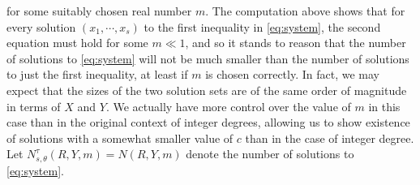 \documentclass[11pt,reqno]{amsart}
\numberwithin{equation}{section}
\begin{document}
for some suitably chosen real number $m$. The computation above shows that for every solution $(x_1,\cdots, x_s)$ to the first inequality in \eqref{eq:system}, the second equation must hold for some $m \ll 1$, and so it stands to reason that the number of solutions to \eqref{eq:system} will not be much smaller than the number of solutions to just the first inequality, at least if $m$ is chosen correctly. In fact, we may expect that the sizes of the two solution sets are of the same order of magnitude in terms of $X$ and $Y$. We actually have more control over the value of $m$ in this case than in the original context of integer degrees, allowing us to show existence of solutions with a somewhat smaller value of $c$ than in the case of integer degree. Let $N_{s,\theta}^{\tau}(R,Y,m) = N(R,Y,m)$ denote the number of solutions to \eqref{eq:system}. 
\end{document}

